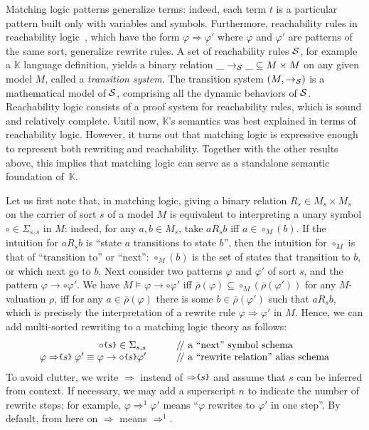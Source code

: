 \documentclass[UTF8,11pt]{article}
\theoremstyle{plain}
\theoremstyle{definition}
\theoremstyle{remark}
\newcommand{\K}{\mbox{$\mathbb{K}$}\xspace}
\newcommand{\parametric}[2]{{#1}\raisebox{.2ex}{\texttt{\footnotesize{\{}}}#2\raisebox{.2ex}{\texttt{\footnotesize{\}}}}}
\newcommand{\doubleslash}{/\!/{ }}
\newcommand{\ra}{\rightarrow}
\begin{document}
Matching logic patterns generalize terms: indeed, each term $t$ is a
particular pattern built only with variables and symbols.
Furthermore, reachability rules in reachability
logic~\cite{rosu-stefanescu-ciobaca-moore-2013-lics,stefanescu-ciobaca-mereuta-moore-serbanuta-rosu-2014-rta},
which have the form $\varphi \Rightarrow \varphi'$ where $\varphi$ and $\varphi'$
are patterns of the same sort, generalize rewrite rules.
A set of reachability rules $\cal S$, for example a \K language
definition, yields a binary relation $\_\ra_{\cal S}\_ \subseteq M \times M$
on any given model $M$, called a \emph{transition system}.
The transition system $(M,\ra_{\cal S})$ is a mathematical model of $\cal S$,
comprising all the dynamic behaviors of $\cal S$.
Reachability logic consists of a proof system for reachability rules,
which is sound and relatively complete.
Until now, \K's semantics was best explained in terms of reachability logic.
However, it turns out that matching logic is expressive enough to represent
both rewriting and reachability.
Together with the other results above, this implies that matching
logic can serve as a standalone semantic foundation of~$\K$.

Let us first note that, in matching logic, giving a binary relation
$R_s \in M_s \times M_s$ on the carrier of sort $s$ of a model $M$
is equivalent to interpreting a unary symbol $\circ \in \Sigma_{s,s}$ in $M$:
indeed, for any $a,b\in M_s$, take $a\mathrel{R_s} b$ iff $a \in \circ_M(b)$.
If the intuition for $a \mathrel{R_s} b$ is ``state $a$ transitions to
state $b$'', then the intuition for $\circ_M$ is that of ``transition to''
or ``next'':
$\circ_M(b)$ is the set of states that transition to $b$, or which next go
to $b$.
Next consider two patterns $\varphi$ and $\varphi'$ of sort $s$, and the
pattern $\varphi \ra \circ \varphi'$.
We have $M \models \varphi \ra \circ \varphi'$ iff
$\overline{\rho}(\varphi) \subseteq \circ_M(\overline{\rho}(\varphi'))$
for any $M$-valuation $\rho$, iff for any $a\in\overline{\rho}(\varphi)$
there is some $b \in \overline{\rho}(\varphi')$ such that $a\mathrel{R_s}b$,
which is precisely the interpretation of a rewrite rule
$\varphi \Rightarrow \varphi'$ in $M$.
Hence, we can add multi-sorted rewriting to a matching logic theory
as follows:
$$
\begin{array}{r@{\hspace*{7ex}}l}
\parametric{\circ}{s} \in \Sigma_{s,s}
& \textrm{\doubleslash a ``next'' symbol schema}
\\
\varphi\mathrel{\parametric{\Rightarrow}{s}}\varphi'
\equiv \varphi \rightarrow \parametric{\circ}{s} \varphi'
& \textrm{\doubleslash a ``rewrite relation'' alias schema}
\end{array}
$$
To avoid clutter, we write $\Rightarrow$ instead of
$\parametric{\Rightarrow}{s}$ and assume that $s$ can be inferred from
context.
If necessary, we may add a superscript $n$ to indicate the number of rewrite steps;
for example, $\varphi \Rightarrow^1 \varphi'$ means
``$\varphi$ rewrites to $\varphi'$ in one step''.
By default, from here on $\Rightarrow$ means $\Rightarrow^1$.
\end{document}
